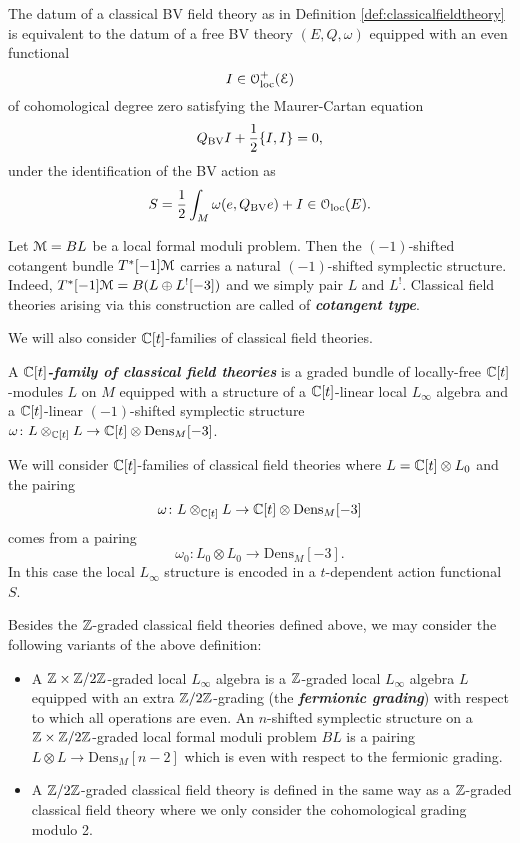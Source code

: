 \documentclass[10pt, oneside]{article}
\newcommand{\Dens}{\mathrm{Dens}}
\newcommand{\defterm}[1]{\textbf{\emph{#1}}}
\begin{document}
The datum of a classical BV field theory as in Definition \ref{def:classicalfieldtheory} is equivalent to the datum of a free BV theory $(E, Q, \omega)$ equipped with an even functional
\[I \in \mathcal{O}_{\rm loc}^+(\mathcal E)\]
of cohomological degree zero satisfying the Maurer-Cartan equation
\[Q_{\mathrm{BV}} I + \frac{1}{2} \{I,I\} = 0,\]
under the identification of the BV action as
\[S = \frac{1}{2} \int_M \omega(e, Q_{\mathrm{BV}} e) + I\in \mathcal{O}_{\rm loc}(E).\]

\begin{example} \label{def:cotangent_type}
Let $\mathcal M=BL$ be a local formal moduli problem. Then the $(-1)$-shifted cotangent bundle $T^*[-1]\mathcal M$ carries a natural $(-1)$-shifted symplectic structure. Indeed, $T^*[-1]\mathcal M = B(L\oplus L^![-3])$ and we simply pair $L$ and $L^!$. Classical field theories arising via this construction are called of \defterm{cotangent type}.
\end{example}

We will also consider $\mathbb C[t]$-families of classical field theories.
\begin{definition} \label{family_of_BV_theories_def}
A \defterm{$\mathbb C[t]$-family of classical field theories} is a graded bundle of locally-free $\mathbb C[t]$-modules $L$ on $M$ equipped with a structure of a $\mathbb C[t]$-linear local $L_\infty$ algebra and a $\mathbb C[t]$-linear $(-1)$-shifted symplectic structure $\omega\colon L\otimes_{\CC[t]} L\rightarrow \CC[t]\otimes \Dens_M[-3]$.
\end{definition}

We will consider $\mathbb C[t]$-families of classical field theories where $L = \mathbb C[t]\otimes L_0$ and the pairing
\[\omega\colon L\otimes_{\CC[t]} L\rightarrow \CC[t]\otimes \Dens_M[-3]\]
comes from a pairing
\[\omega_0\colon L_0\otimes L_0\rightarrow \Dens_M[-3].\]
In this case the local $L_\infty$ structure is encoded in a $t$-dependent action functional $S$.

\begin{remark}
Besides the $\mathbb Z$-graded classical field theories defined above, we may consider the following variants of the above definition:
\begin{itemize}
\item A $\mathbb Z\times \mathbb Z/2\mathbb Z$-graded local $L_\infty$ algebra is a $\mathbb Z$-graded local $L_\infty$ algebra $L$ equipped with an extra $\mathbb Z/2\mathbb Z$-grading (the \defterm{fermionic grading}) with respect to which all operations are even. An $n$-shifted symplectic structure on a $\mathbb Z\times\mathbb Z/2\mathbb Z$-graded local formal moduli problem $BL$ is a pairing $L\otimes L\rightarrow \Dens_M[n-2]$ which is even with respect to the fermionic grading.

\item A $\mathbb Z/2\mathbb Z$-graded classical field theory is defined in the same way as a $\mathbb Z$-graded classical field theory where we only consider the cohomological grading modulo 2.
\end{itemize}
\end{remark}
\end{document}
